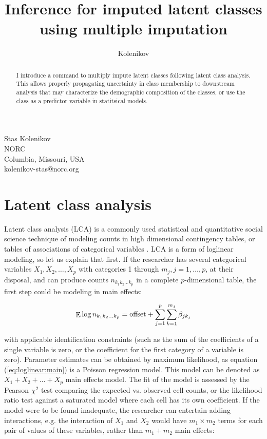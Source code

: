 \author{Kolenikov}{%
  Stas Kolenikov\\NORC\\Columbia, Missouri, USA\\kolenikov-stas@norc.org
}
\title[Post-estimation for LCA via MI]{Inference for imputed latent classes using multiple imputation}
\maketitle

\begin{abstract}
I introduce a command to multiply impute latent classes
following  latent class analysis. 
This allows properly propagating uncertainty in class 
membership to downstream analysis that may characterize
the demographic composition of the classes, or use 
the class as a predictor variable in statitsical models.

\end{abstract}

\section{Latent class analysis}

Latent class analysis (LCA) is a commonly used statistical and quantitative
social science technique of modeling counts in high dimensional contingency tables,
or tables of associations of categorical variables
\citet{hagenaars:mccutcheon:2002,mccutcheon:1987}. 
LCA is a form of loglinear modeling, so let us explain that first.
If the researcher has several categorical variables $X_1, X_2, \ldots, X_p$
with categories 1 through $m_j, j=1, \ldots, p$,
at their disposal, and can produce counts $n_{{k_1}{k_2}\ldots{k_p}}$ 
in a complete $p$-dimensional table, the first step could be modeling
in main effects:

\begin{equation}
  \label{eq:loglinear:main}
  \mathop{\mathbb{E}} \log n_{{k_1}{k_2}\ldots{k_p}} = 
  \mathrm{offset} + 
  \sum_{j=1}^p \sum_{k=1}^{m_j} \beta_{jk_j} 
\end{equation}

\noindent
with applicable identification constraints (such as the sum of the coefficients
of a single variable is zero, or the coefficient for the first category 
of a variable is zero). Parameter estimates can be obtained by maximum
likelihood, as equation (\ref{eq:loglinear:main}) is a Poisson regression model.
This model can be denoted as $X_1 + X_2 + \ldots + X_p$ main effects model.
The fit of the model is assessed by the Pearson $\chi^2$ test comparing the
expected vs. observed cell counts, or the likelihood ratio test against a saturated
model where each cell has its own coefficient. If the model were to be found inadequate,
the researcher can entertain adding interactions, e.g. the interaction of 
$X_1$ and $X_2$ would have $m_1 \times m_2$ terms for each pair of values 
of these variables, rather than $m_1 + m_2$ main effects:

